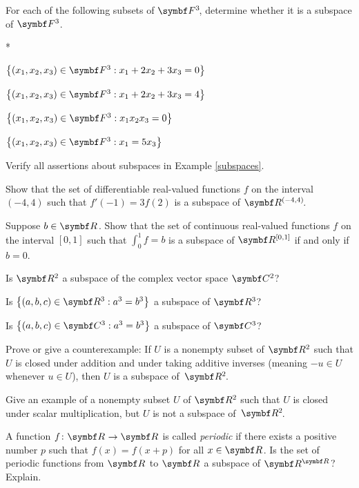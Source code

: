 \begin{exercises}

\exercise
For each of the following subsets of $\FF{3}$, determine whether it is a
subspace of $\F{3}$.
\begin{subtheorem}*
\item
$\br[\big]{ (x_1, x_2, x_3) \in \F{3}: x_1 + 2 x_2 + 3 x_3 = 0 }$

\item
$\br[\big]{ (x_1, x_2, x_3) \in \F{3}: x_1 + 2 x_2 + 3 x_3 = 4 }$

\item
$\br[\big]{ (x_1, x_2, x_3) \in \F{3}: x_1 x_2 x_3 = 0 }$

\item
$\br[\big]{ (x_1, x_2, x_3) \in \F{3}: x_1 = 5 x_3 }$
\end{subtheorem}
\exercisesubtheoremend


\exercise
Verify all assertions about subspaces in Example \ref{subspaces}.


\exercise
Show that the set of differentiable real-valued functions $f$ on the interval $(-4, 4)$ such that $f'\!(-1) = 3f(2)$ is a subspace of
$\RR{(-4, 4)}$.


\pagebreak[1]

\exercise
Suppose $b \in \R{}$. Show that the set of continuous real-valued functions $f$ on the interval $[0, 1]$ such that $\int_0^1 f = b$ is a subspace of $\R{[0, 1]}$ if and only if $b = 0$.


\exercise
Is $\R{2}$ a subspace of the complex vector space $\C{2}$?


\exercise
\begin{SUBtheorem}
\item
Is $\br[\big]{(a, b, c) \in \R{3}: a^3 =b^3}$ a subspace of $\R{3}$?
\item
Is $\br[\big]{(a, b, c) \in \C{3}: a^3 =b^3}$ a subspace of $\C{3}$?
\end{SUBtheorem}


\exercise
Prove or give a counterexample: If $U$ is a nonempty subset of $\R{2}$ such that $U$ is closed
under addition and under taking additive inverses (meaning $-u \in U$
whenever $u \in U$), then $U$ is a subspace of~$\RR{2}$.


\exercise
Give an example of a nonempty subset $U$ of $\R{2}$ such that $U$ is closed
under scalar multiplication, but $U$ is not a subspace of~$\RR{2}$.


\exercise
A function $\fun f {\R{}} {\R{}}$ is called \emph{periodic} if there exists a positive number $p$ such that $f(x) = f(x + p)$ for all $x \in \R{}$. Is the set of periodic functions from $\R{}$ to $\R{}$ a subspace of $\R{\R{}}$? Explain.



\end{exercises}

